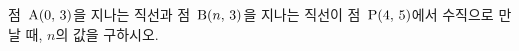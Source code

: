점~$\mathrm{A}(0,\mkern3mu 3)$을 지나는 직선과 점~$\mathrm{B}(n,\mkern3mu 3)$을 지나는 직선이 점~$\mathrm{P}(4,\mkern3mu 5)$에서 수직으로 만날 때, $n$의 값을 구하시오.
